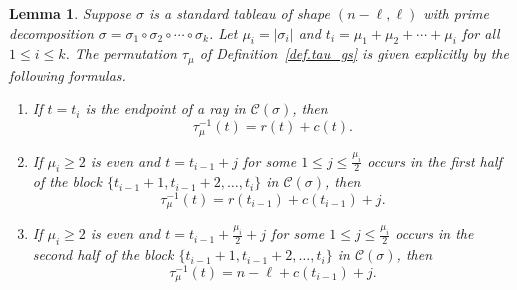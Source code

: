 \documentclass[11pt]{amsart}
\newtheorem{lemma}[theorem]{Lemma}
\theoremstyle{remark}
\theoremstyle{remark}
\theoremstyle{definition}
\theoremstyle{definition}
\theoremstyle{definition}
\numberwithin{equation}{section}
\newcommand{\gs}{\sigma}
\newcommand{\cc}{\mathcal{C}}
\newcommand{\cupsigma}{\cc(\gs)}
\newcommand{\parsum}{t}
\begin{document}
\begin{lemma}\label{lemma.tau_gs.formula} Suppose $\gs$ is a standard tableau of shape $(n-\ell, \ell)$ with prime decomposition $\gs=\gs_1\circ\gs_2\circ \cdots \circ \gs_k$. Let $\mu_i = |\gs_i|$ and $\parsum_i = \mu_1+\mu_2+\cdots +\mu_i$ for all $1\leq i \leq k$. The permutation $\tau_\mu$ of Definition~\ref{def.tau_gs} is given explicitly by the following formulas.
\begin{enumerate}
\item   If $t=\parsum_i$ is the endpoint of a ray in $\cupsigma$, then
\[
\tau_\mu^{-1}(t) = r(t)+c(t).
\]
\item  If $\mu_i\geq 2$ is even and $t=\parsum_{i-1}+j$ for some $1\leq j \leq \frac{\mu_i}{2}$ occurs in the first half of the block $\{\parsum_{i-1}+1, \parsum_{i-1}+2, \ldots, \parsum_i\}$ in $\cupsigma$, then 
\[
\tau_\mu^{-1}(t) = r(\parsum_{i-1})+c(\parsum_{i-1})+j.
\]
\item  If $\mu_i\geq 2$ is even and $t=\parsum_{i-1}+\frac{\mu_i}{2}+j$ for some $1\leq j \leq \frac{\mu_i}{2}$ occurs in the second half of the block $\{\parsum_{i-1}+1, \parsum_{i-1}+2, \ldots, \parsum_i\}$ in $\cupsigma$, then
\[
\tau_\mu^{-1}(t) = n-\ell + c(\parsum_{i-1}) +j. 
\]
\end{enumerate}
\end{lemma}
\end{document}

